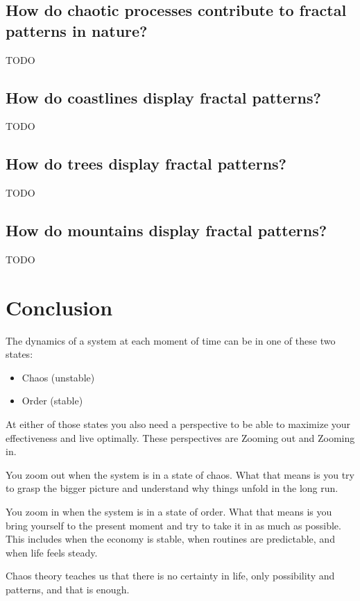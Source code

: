 \documentclass[12pt]{article}
\begin{document}
\subsection{How do chaotic processes contribute to fractal patterns in nature?}
TODO

\subsection{How do coastlines display fractal patterns?}
TODO

\subsection{How do trees display fractal patterns?}
TODO

\subsection{How do mountains display fractal patterns?}
TODO

\section{Conclusion}

The dynamics of a system at each moment of time can be in one of these two states:
\begin{itemize}
    \item Chaos (unstable)
    \item Order (stable)
\end{itemize}


At either of those states you also need a perspective to be able to maximize your effectiveness and live optimally. These perspectives are Zooming out and Zooming in. 

You zoom out when the system is in a state of chaos. What that means is you try to grasp the bigger picture and understand why things unfold in the long run.

You zoom in when the system is in a state of order. What that means is you bring yourself to the present moment and try to take it in as much as possible. This includes when the economy is stable, when routines are predictable, and when life feels steady.

Chaos theory teaches us that there is no certainty in life, only possibility and patterns, and that is enough.


\nocite{*} 
 

\end{document}
